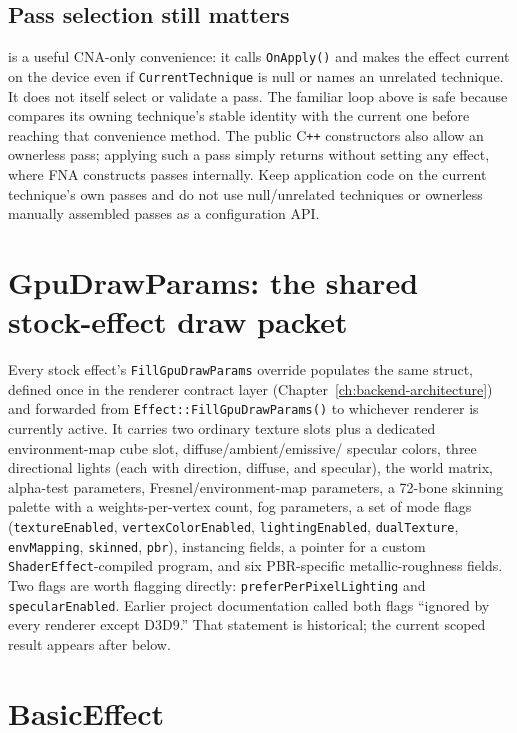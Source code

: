 \subsection{Pass selection still matters}

 is a useful CNA-only convenience: it calls \texttt{OnApply()} and
makes the effect current on the device even if \texttt{CurrentTechnique} is null or names an
unrelated technique. It does not itself select or validate a pass. The familiar loop above is
safe because  compares its owning technique's stable identity with
the current one before reaching that convenience method. The public C\texttt{++} constructors
also allow an ownerless pass; applying such a pass simply returns without setting any effect,
where FNA constructs passes internally. Keep application code on the current technique's own
passes and do not use null/unrelated techniques or ownerless manually assembled passes as a
configuration API.

\section{GpuDrawParams: the shared stock-effect draw packet}

Every stock effect's \texttt{FillGpuDrawParams} override populates the same struct, defined
once in the renderer contract layer (Chapter~\ref{ch:backend-architecture}) and forwarded from
\texttt{Effect::FillGpuDrawParams()} to whichever renderer is currently active. It carries two
ordinary texture slots plus a dedicated environment-map cube slot, diffuse/ambient/emissive/%
specular colors, three directional lights (each with direction, diffuse, and specular),
the world matrix, alpha-test parameters, Fresnel/environment-map parameters, a 72-bone
skinning palette with a weights-per-vertex count, fog parameters, a set of mode flags
(\texttt{textureEnabled}, \texttt{vertexColorEnabled}, \texttt{lightingEnabled},
\texttt{dualTexture}, \texttt{envMapping}, \texttt{skinned}, \texttt{pbr}), instancing fields,
a pointer for a custom \texttt{ShaderEffect}-compiled program, and six PBR-specific
metallic-roughness fields. Two flags are worth flagging directly: \texttt{preferPerPixelLighting}
and \texttt{specularEnabled}. Earlier project documentation called both flags ``ignored by
every renderer except D3D9.'' That statement is historical; the current scoped result appears
after  below.

\section{BasicEffect}

